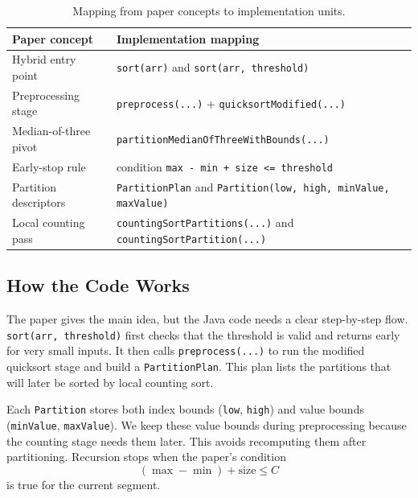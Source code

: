 \documentclass[11pt]{article}
\begin{document}
    \begin{table}[H]
        \centering
        \caption{Mapping from paper concepts to implementation units.}
        \label{tab:mapping}
        \small
        \begin{tabularx}{\textwidth}{>{\raggedright\arraybackslash}p{4.0cm} >{\raggedright\arraybackslash}X}
            \toprule
            Paper concept & Implementation mapping \\
            \midrule
            Hybrid entry point & \texttt{sort(arr)} and \texttt{sort(arr, threshold)} \\
            Preprocessing stage & \texttt{preprocess(...)} + \texttt{quicksortModified(...)} \\
            Median-of-three pivot & \texttt{partitionMedianOfThreeWithBounds(...)} \\
            Early-stop rule & condition \texttt{max - min + size <= threshold} \\
            Partition descriptors & \texttt{PartitionPlan} and \texttt{Partition(low, high, minValue, maxValue)} \\
            Local counting pass & \texttt{countingSortPartitions(...)} and \texttt{countingSortPartition(...)} \\
            \bottomrule
        \end{tabularx}
        \normalsize
    \end{table}

    \subsection{How the Code Works}

    The paper gives the main idea, but the Java code needs a clear step-by-step flow.
    \texttt{sort(arr, threshold)} first checks that the threshold is valid and returns early for
    very small inputs. It then calls \texttt{preprocess(...)} to run the modified quicksort stage
    and build a \texttt{PartitionPlan}. This plan lists the partitions that will later be sorted
    by local counting sort.

    Each \texttt{Partition} stores both index bounds (\texttt{low}, \texttt{high}) and value
    bounds (\texttt{minValue}, \texttt{maxValue}). We keep these value bounds during
    preprocessing because the counting stage needs them later. This avoids recomputing them after
    partitioning. Recursion stops when the paper's condition
    \[
        (\max - \min) + \text{size} \leq C
    \]
    is true for the current segment.
\end{document}
